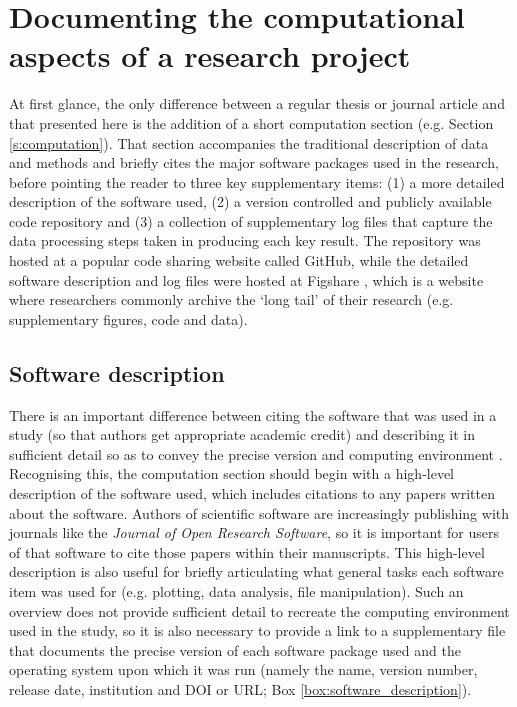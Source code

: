   
\section{Documenting the computational aspects of a research project}\label{s:reproducibility_approach}

At first glance, the only difference between a regular thesis or journal article and that presented here is the addition of a short computation section (e.g. Section \ref{s:computation}). That section accompanies the traditional description of data and methods and briefly cites the major software packages used in the research, before pointing the reader to three key supplementary items: (1) a more detailed description of the software used, (2) a version controlled and publicly available code repository and (3) a collection of supplementary log files that capture the data processing steps taken in producing each key result. The repository was hosted at a popular code sharing website called GitHub, while the detailed software description and log files were hosted at Figshare \citep{IrvingFigshare2016}, which is a website where researchers commonly archive the `long tail' of their research (e.g. supplementary figures, code and data). 

\subsection{Software description}

There is an important difference between citing the software that was used in a study (so that authors get appropriate academic credit) and describing it in sufficient detail so as to convey the precise version and computing environment \citep{Jackson2012}. Recognising this, the computation section should begin with a high-level description of the software used, which includes citations to any papers written about the software. Authors of scientific software are increasingly publishing with journals like the \textit{Journal of Open Research Software}, so it is important for users of that software to cite those papers within their manuscripts. This high-level description is also useful for briefly articulating what general tasks each software item was used for (e.g. plotting, data analysis, file manipulation). Such an overview does not provide sufficient detail to recreate the computing environment used in the study, so it is also necessary to provide a link to a supplementary file that documents the precise version of each software package used and the operating system upon which it was run (namely the name, version number, release date, institution and DOI or URL; Box \ref{box:software_description}). 

